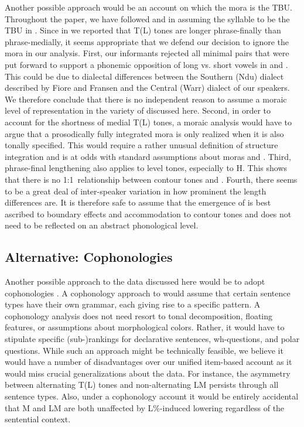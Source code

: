 \documentclass[output=paper,newtxmath,modfonts,nonflat,hidelinks]{langsci/langscibook}
\begin{document}
Another possible approach would be an account on which the mora is the TBU.
Throughout the paper, we have followed \citet{Fiore.1987} and \citet{Fransen.1995} in assuming the syllable to be the TBU in .
Since in  we reported that T(L) tones are longer phrase-finally than phrase-medially, it seems appropriate that we defend our decision to ignore the mora in our analysis.
First, our informants rejected all minimal pairs that were put forward to support a phonemic opposition of long vs. short vowels in \citet{Fiore.1987} and \citet{Fransen.1995}. %
This could be due to dialectal differences between the Southern (Ndu) dialect described by Fiore and Fransen and the Central (Warr) dialect of our speakers.
We therefore conclude that there is no independent reason to assume a moraic level of representation in the variety of  discussed here.
Second, in order to account for the shortness of medial T(L) tones, a moraic analysis would have to argue that a prosodically fully integrated mora is only realized when it is also tonally specified.
This would require a rather unusual definition of structure integration and is at odds with standard assumptions about moras and  \citep{Hyman.1985,Hayes.1989,Davis.2011.HANDBOOK,Davis.2011.COMPANION,Zimmermann.2017.OUP}.
Third, phrase-final lengthening also applies to level tones, especially to H.
This shows that there is no 1:1~relationship between contour tones and .  
Fourth, there seems to be a great deal of inter-speaker variation in how prominent the length differences are. %
It is therefore safe to assume that the emergence of  is best ascribed to boundary effects and accommodation to contour tones and does not need to be reflected on an abstract phonological level.

\subsection{Alternative: Cophonologies}

Another possible approach to the data discussed here would be to adopt cophonologies \citep{Orgun.1996,InkelasandZoll.2007,Sande.2017}.
A cophonology approach to   would assume that certain sentence types have their own grammar, each giving rise to a specific  pattern.
A cophonology analysis does not need resort to tonal decomposition, floating features, or assumptions about morphological colors.
Rather, it would have to stipulate specific (sub-)rankings for declarative sentences, wh-questions, and polar questions.
While such an approach might be technically feasible, we believe it would have a number of disadvantages over our unified item-based account as it would miss crucial generalizations about the data.
For instance, the asymmetry between alternating T(L) tones and non-alternating LM persists through all sentence types.
Also, under a cophonology account it would be entirely accidental that M and LM are both unaffected by L\%-induced lowering regardless of the sentential context.
\end{document}
